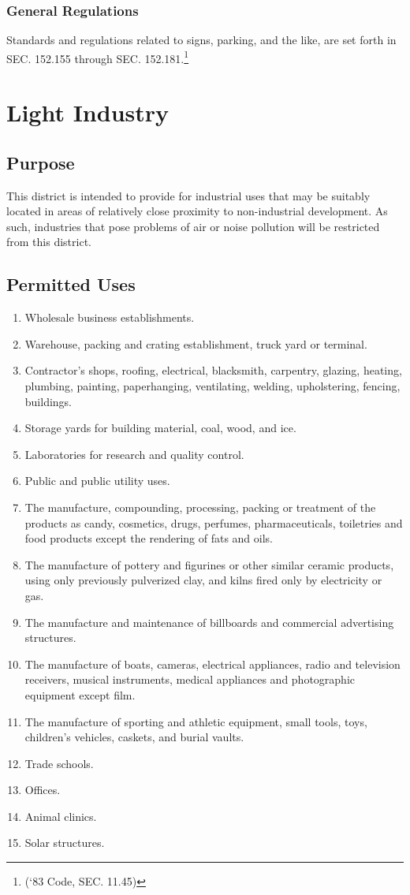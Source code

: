 \subsubsection{General Regulations}
Standards and regulations related to signs, parking, and the like, are set forth in SEC. 152.155 through SEC. 152.181.\footnote{(‘83 Code, SEC. 11.45)}
\section{Light Industry}
\subsection{Purpose}
This district is intended to provide for industrial uses that may be suitably located in areas of relatively close proximity to non-industrial development. As such, industries that pose problems of air or noise pollution will be restricted from this district.
\subsection{Permitted Uses}
\begin{enumerate}[{\indent}1)]
    \item Wholesale business establishments.
    \item Warehouse, packing and crating establishment, truck yard or terminal.
    \item Contractor’s shops, roofing, electrical, blacksmith, carpentry, glazing, heating, plumbing, painting, paperhanging, ventilating, welding, upholstering, fencing, buildings.
    \item Storage yards for building material, coal, wood, and ice.
    \item Laboratories for research and quality control.
    \item Public and public utility uses.
    \item The manufacture, compounding, processing, packing or treatment of the products as candy, cosmetics, drugs, perfumes, pharmaceuticals, toiletries and food products except the rendering of fats and oils.
    \item The manufacture of pottery and figurines or other similar ceramic products, using only previously pulverized clay, and kilns fired only by electricity or gas.
    \item The manufacture and maintenance of billboards and commercial advertising structures.
    \item The manufacture of boats, cameras, electrical appliances, radio and television receivers, musical instruments, medical appliances and photographic equipment except film.
    \item The manufacture of sporting and athletic equipment, small tools, toys, children’s vehicles, caskets, and burial vaults.
    \item Trade schools.
    \item Offices.
    \item Animal clinics.
    \item Solar structures.
\end{enumerate}
